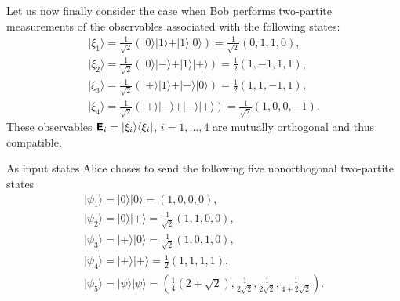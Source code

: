 \documentclass[%
 preprint,
 showpacs,
 showkeys,
 preprintnumbers,
 amsmath,amssymb,
 aps,
 pra,
  longbibliography,
 ]{revtex4-1}
\begin{document}
Let us now finally consider
the case when Bob performs  two-partite measurements of the
observables associated with the following states:
\begin{equation}
\begin{array}{l}
\vert \xi_1 \rangle =\frac{1}{\sqrt{2} }
\left( \vert 0 \rangle \vert 1 \rangle + \vert 1 \rangle \vert 0 \rangle \right)
= \frac{1}{\sqrt{2}} (0,1,1,0)
, \\
\vert \xi_2 \rangle =\frac{1}{\sqrt{2} }
\left( \vert 0 \rangle \vert - \rangle + \vert 1 \rangle \vert + \rangle \right)
= \frac{1}{{2}} (1,-1,1,1)
, \\
\vert \xi_3 \rangle =\frac{1}{\sqrt{2} }
\left( \vert + \rangle \vert 1 \rangle + \vert - \rangle \vert 0 \rangle \right)
= \frac{1}{{2}} (1,1,-1,1)
, \\
\vert \xi_4 \rangle =\frac{1}{\sqrt{2} }
\left( \vert + \rangle \vert - \rangle + \vert - \rangle \vert + \rangle \right)
= \frac{1}{\sqrt{2}} (1,0,0,-1)
.
\end{array}
\end{equation}
These observables
$\textsf{\textbf{E}}_i = \vert \xi_i \rangle  \langle \xi_i   \vert $,
$i=1,\ldots, 4$
 are mutually orthogonal and thus compatible.

As input states Alice choses to send the following five nonorthogonal two-partite states
\begin{equation}
\begin{array}{l}
\vert \psi_1 \rangle =
\vert 0 \rangle \vert 0  \rangle
= (1,0,0,0)
, \\
\vert \psi_2 \rangle =
\vert 0 \rangle \vert +   \rangle
=\frac{1}{\sqrt{2} } (1,1,0,0)
, \\
\vert \psi_3 \rangle =
\vert + \rangle \vert 0   \rangle
=\frac{1}{\sqrt{2} } (1,0,1,0)
, \\
\vert \psi_4 \rangle =
\vert + \rangle \vert +   \rangle
=\frac{1}{ {2} } (1,1,1,1)
, \\
\vert \psi_5 \rangle =
\vert \psi \rangle \vert \psi   \rangle
=\left(\frac{1}{4}\left(2+\sqrt{2}\right),
\frac{1}{2\sqrt{2}},\frac{1}{2\sqrt{2}},\frac{1}{4+2\sqrt{2}}\right)
.
\end{array}
\end{equation}
\end{document}

